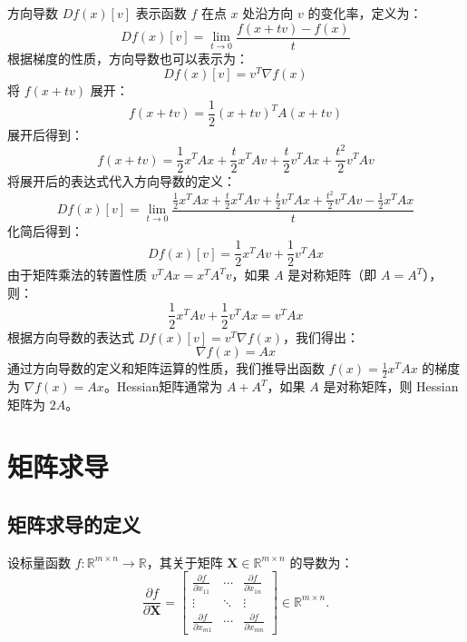 \documentclass[lang=cn,11pt,a4paper]{elegantpaper}
\begin{document}
方向导数 \( D f(x)[v] \) 表示函数 \( f \) 在点 \( x \) 处沿方向 \( v \) 的变化率，定义为：
\begin{equation}
D f(x)[v] = \lim_{t \to 0} \frac{f(x + t v) - f(x)}{t}
\end{equation}
根据梯度的性质，方向导数也可以表示为：
\begin{equation}
D f(x)[v] = v^T \nabla f(x)
\end{equation}
将 \( f(x + t v) \) 展开：
\begin{equation}
f(x + t v) = \frac{1}{2} (x + t v)^T A (x + t v)
\end{equation}
展开后得到：
\begin{equation}
f(x + t v) = \frac{1}{2} x^T A x + \frac{t}{2} x^T A v + \frac{t}{2} v^T A x + \frac{t^2}{2} v^T A v
\end{equation}
将展开后的表达式代入方向导数的定义：
\begin{equation}
D f(x)[v] = \lim_{t \to 0} \frac{\frac{1}{2} x^T A x + \frac{t}{2} x^T A v + \frac{t}{2} v^T A x + \frac{t^2}{2} v^T A v - \frac{1}{2} x^T A x}{t}
\end{equation}
化简后得到：
\begin{equation}
D f(x)[v] = \frac{1}{2} x^T A v + \frac{1}{2} v^T A x
\end{equation}
由于矩阵乘法的转置性质 \( v^T A x = x^T A^T v \)，如果 \( A \) 是对称矩阵（即 \( A = A^T \)），则：
\begin{equation}
\frac{1}{2} x^T A v + \frac{1}{2} v^T A x = v^T A x
\end{equation}
根据方向导数的表达式 \( D f(x)[v] = v^T \nabla f(x) \)，我们得出：
\begin{equation}
\nabla f(x) = A x
\end{equation}
通过方向导数的定义和矩阵运算的性质，我们推导出函数 \( f(x) = \frac{1}{2} x^T A x \) 的梯度为 \( \nabla f(x) = A x \)。Hessian矩阵通常为 \( A + A^T \)，如果 \( A \) 是对称矩阵，则 Hessian 矩阵为 \( 2A \)。

\section{矩阵求导}


\subsection{矩阵求导的定义}
设标量函数 \( f: \mathbb{R}^{m \times n} \to \mathbb{R} \)，其关于矩阵 \(\bm{X} \in \mathbb{R}^{m \times n}\) 的导数为：
\[
\frac{\partial f}{\partial \bm{X}} = \begin{bmatrix}
\frac{\partial f}{\partial x_{11}} & \cdots & \frac{\partial f}{\partial x_{1n}} \\
\vdots & \ddots & \vdots \\
\frac{\partial f}{\partial x_{m1}} & \cdots & \frac{\partial f}{\partial x_{mn}} 
\end{bmatrix} \in \mathbb{R}^{m \times n}.
\]
\end{document}
